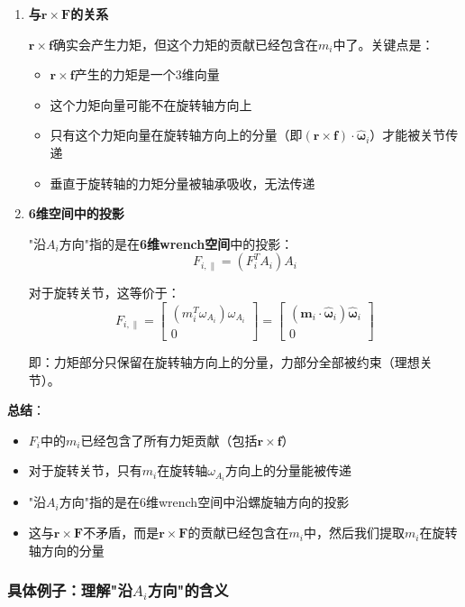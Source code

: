 \documentclass[12pt,a4paper]{article}
\begin{document}
\begin{enumerate}
\item \textbf{与$\bm{r} \times \bm{F}$的关系}

$\bm{r} \times \bm{f}$确实会产生力矩，但这个力矩的贡献已经包含在$m_i$中了。关键点是：
\begin{itemize}
\item $\bm{r} \times \bm{f}$产生的力矩是一个3维向量
\item 这个力矩向量可能不在旋转轴方向上
\item 只有这个力矩向量在旋转轴方向上的分量（即$(\bm{r} \times \bm{f}) \cdot \hat{\bm{\omega}}_i$）才能被关节传递
\item 垂直于旋转轴的力矩分量被轴承吸收，无法传递
\end{itemize}

\item \textbf{6维空间中的投影}

"沿$A_i$方向"指的是在\textbf{6维wrench空间}中的投影：
\begin{equation}
F_{i,\parallel} = (F_i^T A_i) A_i
\end{equation}

对于旋转关节，这等价于：
\begin{equation}
F_{i,\parallel} = \begin{bmatrix} (m_i^T \omega_{A_i}) \omega_{A_i} \\ 0 \end{bmatrix} = \begin{bmatrix} (\bm{m}_i \cdot \hat{\bm{\omega}}_i) \hat{\bm{\omega}}_i \\ 0 \end{bmatrix}
\end{equation}

即：力矩部分只保留在旋转轴方向上的分量，力部分全部被约束（理想关节）。
\end{enumerate}

\textbf{总结}：
\begin{itemize}
\item $F_i$中的$m_i$已经包含了所有力矩贡献（包括$\bm{r} \times \bm{f}$）
\item 对于旋转关节，只有$m_i$在旋转轴$\omega_{A_i}$方向上的分量能被传递
\item "沿$A_i$方向"指的是在6维wrench空间中沿螺旋轴方向的投影
\item 这与$\bm{r} \times \bm{F}$不矛盾，而是$\bm{r} \times \bm{F}$的贡献已经包含在$m_i$中，然后我们提取$m_i$在旋转轴方向的分量
\end{itemize}

\subsubsection{具体例子：理解"沿$A_i$方向"的含义}
\end{document}
